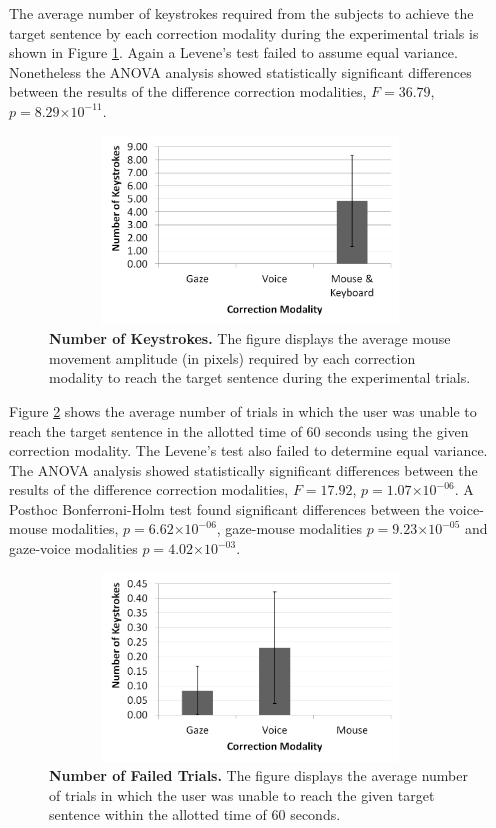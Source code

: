\documentclass[]{article}
\providecommand{\e}[1]{\ensuremath{\times 10^{#1}}}
\begin{document}
The average number of keystrokes required from the subjects to achieve the target sentence by each correction modality
during the experimental trials is shown in Figure \ref{keystrokes}. Again a Levene's test failed to assume equal
variance. Nonetheless the ANOVA analysis showed statistically significant differences between the results of the
difference correction modalities, $F=36.79$, $p=8.29\e{-11}$. 

\begin{figure}[ht]
\begin{center}
\vspace{-3mm}
\includegraphics[width=0.95\textwidth,height=50mm]{figures/keystrokes.png}
\end{center}
\caption{\textbf{Number of Keystrokes.} The figure displays the average mouse movement amplitude (in pixels)
required by each correction modality to reach the target sentence during the experimental trials.}
\label{keystrokes}
\end{figure}


Figure \ref{failFig} shows the average number of trials in which the user was unable to reach the target sentence in the
allotted time of 60 seconds using the given correction modality. The Levene's test also failed to determine equal
variance. The ANOVA analysis showed statistically significant differences between the results of the
difference correction modalities, $F=17.92$, $p=1.07\e{-06}$.   A Posthoc Bonferroni-Holm test found
significant differences between the voice-mouse modalities, $p=6.62\e{-06}$, gaze-mouse modalities $p=9.23\e{-05}$
and gaze-voice modalities $p=4.02\e{-03}$.

\begin{figure}[ht]
\begin{center}
\vspace{-3mm}
\includegraphics[width=0.95\textwidth,height=50mm]{figures/fail.png}
\end{center}
\caption{\textbf{Number of Failed Trials.} The figure displays the average number of trials in which the user
was unable to reach the given target sentence within the allotted time of 60 seconds.}
\label{failFig}
\end{figure}
\end{document}

